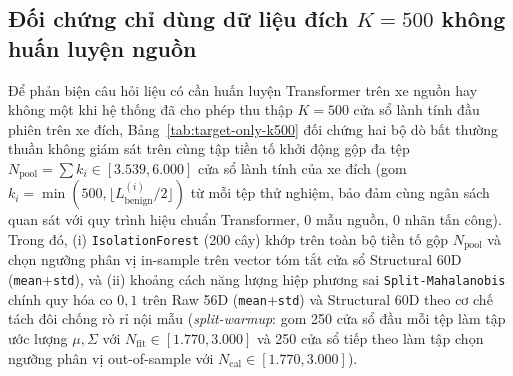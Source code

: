\documentclass[12pt, a4paper, reqno, oneside]{book}
\DeclareRobustCommand{\code}[1]{\nolinkurl{#1}}
\begin{document}
{\subsection{Đối chứng chỉ dùng dữ liệu đích \texorpdfstring{$K=500$}{K=500} không huấn luyện nguồn}\label{subsec:target-only-k500}
Để phản biện câu hỏi liệu có cần huấn luyện Transformer trên xe nguồn hay không một khi hệ thống đã cho phép thu thập $K=500$ cửa sổ lành tính đầu phiên trên xe đích, Bảng~\ref{tab:target-only-k500} đối chứng hai bộ dò bất thường thuần không giám sát trên cùng tập tiền tố khởi động gộp đa tệp $N_{\text{pool}} = \sum k_i \in [3.539, 6.000]$ cửa sổ lành tính của xe đích (gom $k_i = \min(500, \lfloor L_{\text{benign}}^{(i)}/2\rfloor)$ từ mỗi tệp thử nghiệm, bảo đảm cùng ngân sách quan sát với quy trình hiệu chuẩn Transformer, 0 mẫu nguồn, 0 nhãn tấn công). Trong đó, (i) \code{IsolationForest} (200 cây) khớp trên toàn bộ tiền tố gộp $N_{\text{pool}}$ và chọn ngưỡng phân vị in-sample trên vector tóm tắt cửa sổ Structural 60D (\code{mean}+\code{std}), và (ii) khoảng cách năng lượng hiệp phương sai \code{Split-Mahalanobis} chính quy hóa co $0{,}1$ trên Raw 56D (\code{mean}+\code{std}) và Structural 60D theo cơ chế tách đôi chống rò rỉ nội mẫu (\textit{split-warmup}: gom 250 cửa sổ đầu mỗi tệp làm tập ước lượng $\mu,\Sigma$ với $N_{\text{fit}} \in [1.770, 3.000]$ và 250 cửa sổ tiếp theo làm tập chọn ngưỡng phân vị out-of-sample với $N_{\text{cal}} \in [1.770, 3.000]$).

}
\end{document}
